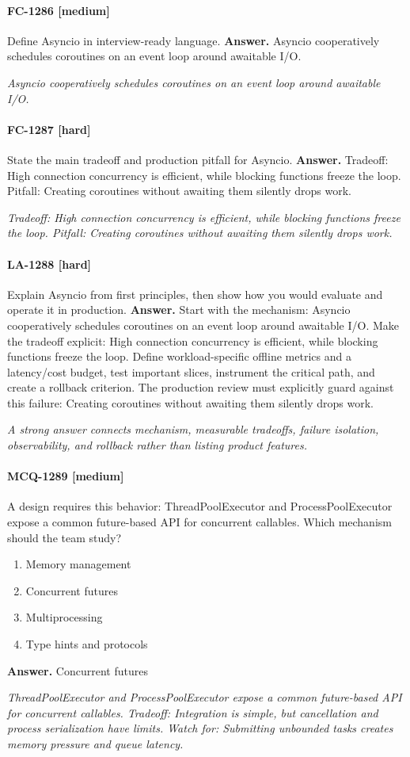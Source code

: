 \paragraph{FC-1286 [medium]} Define Asyncio in interview-ready language.
\noindent\textbf{Answer.} Asyncio cooperatively schedules coroutines on an event loop around awaitable I/O.
\par\textit{Asyncio cooperatively schedules coroutines on an event loop around awaitable I/O.}
\paragraph{FC-1287 [hard]} State the main tradeoff and production pitfall for Asyncio.
\noindent\textbf{Answer.} Tradeoff: High connection concurrency is efficient, while blocking functions freeze the loop. Pitfall: Creating coroutines without awaiting them silently drops work.
\par\textit{Tradeoff: High connection concurrency is efficient, while blocking functions freeze the loop. Pitfall: Creating coroutines without awaiting them silently drops work.}
\paragraph{LA-1288 [hard]} Explain Asyncio from first principles, then show how you would evaluate and operate it in production.
\noindent\textbf{Answer.} Start with the mechanism: Asyncio cooperatively schedules coroutines on an event loop around awaitable I/O. Make the tradeoff explicit: High connection concurrency is efficient, while blocking functions freeze the loop. Define workload-specific offline metrics and a latency/cost budget, test important slices, instrument the critical path, and create a rollback criterion. The production review must explicitly guard against this failure: Creating coroutines without awaiting them silently drops work.
\par\textit{A strong answer connects mechanism, measurable tradeoffs, failure isolation, observability, and rollback rather than listing product features.}
\paragraph{MCQ-1289 [medium]} A design requires this behavior: ThreadPoolExecutor and ProcessPoolExecutor expose a common future-based API for concurrent callables. Which mechanism should the team study?
\begin{enumerate}[label=\Alph*.]
\item Memory management
\item Concurrent futures
\item Multiprocessing
\item Type hints and protocols
\end{enumerate}
\noindent\textbf{Answer.} Concurrent futures
\par\textit{ThreadPoolExecutor and ProcessPoolExecutor expose a common future-based API for concurrent callables. Tradeoff: Integration is simple, but cancellation and process serialization have limits. Watch for: Submitting unbounded tasks creates memory pressure and queue latency.}
